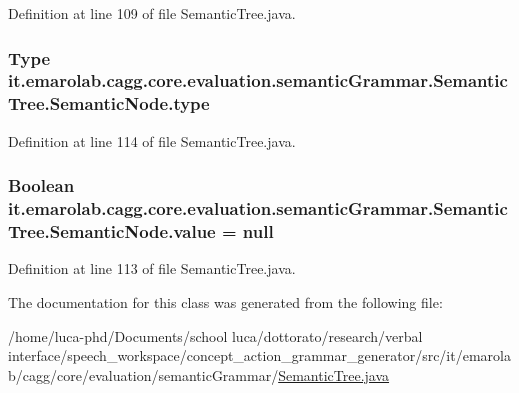 Definition at line 109 of file Semantic\-Tree.\-java.

\hypertarget{classit_1_1emarolab_1_1cagg_1_1core_1_1evaluation_1_1semanticGrammar_1_1SemanticTree_1_1SemanticNode_adbb49d4129159898728fc63dd3224c1e}{
\subsubsection[{type}]{\setlength{\rightskip}{0pt plus 5cm}Type it.\-emarolab.\-cagg.\-core.\-evaluation.\-semantic\-Grammar.\-Semantic\-Tree.\-Semantic\-Node.\-type\hspace{0.3cm}{\ttfamily [private]}}}\label{classit_1_1emarolab_1_1cagg_1_1core_1_1evaluation_1_1semanticGrammar_1_1SemanticTree_1_1SemanticNode_adbb49d4129159898728fc63dd3224c1e}


Definition at line 114 of file Semantic\-Tree.\-java.

\hypertarget{classit_1_1emarolab_1_1cagg_1_1core_1_1evaluation_1_1semanticGrammar_1_1SemanticTree_1_1SemanticNode_ac0c4c50ff85ee767e4b12b97ab3ab686}{
\subsubsection[{value}]{\setlength{\rightskip}{0pt plus 5cm}Boolean it.\-emarolab.\-cagg.\-core.\-evaluation.\-semantic\-Grammar.\-Semantic\-Tree.\-Semantic\-Node.\-value = null\hspace{0.3cm}{\ttfamily [private]}}}\label{classit_1_1emarolab_1_1cagg_1_1core_1_1evaluation_1_1semanticGrammar_1_1SemanticTree_1_1SemanticNode_ac0c4c50ff85ee767e4b12b97ab3ab686}


Definition at line 113 of file Semantic\-Tree.\-java.



The documentation for this class was generated from the following file\-:\begin{DoxyCompactItemize}
\item 
/home/luca-\/phd/\-Documents/school luca/dottorato/research/verbal interface/speech\-\_\-workspace/concept\-\_\-action\-\_\-grammar\-\_\-generator/src/it/emarolab/cagg/core/evaluation/semantic\-Grammar/\hyperlink{SemanticTree_8java}{Semantic\-Tree.\-java}\end{DoxyCompactItemize}
